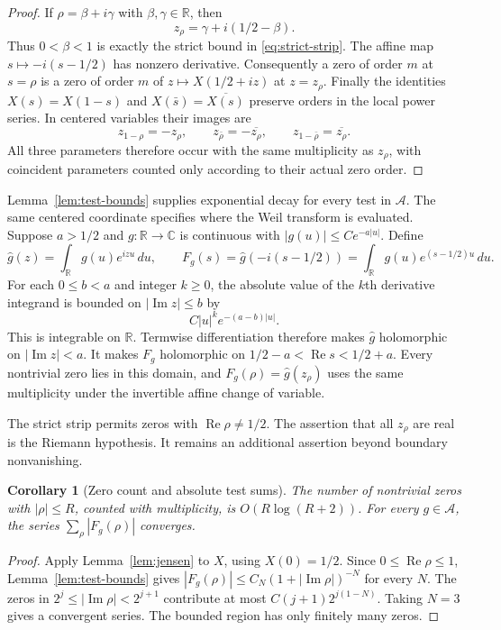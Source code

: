 \documentclass[11pt]{article}
\newtheorem{corollary}[theorem]{Corollary}
\theoremstyle{definition}
\theoremstyle{remark}
\numberwithin{equation}{section}
\newcommand{\R}{\mathbb R}
\newcommand{\C}{\mathbb C}
\newcommand{\A}{\mathcal A}
\begin{document}
\begin{proof}
If $\rho=\beta+i\gamma$ with $\beta,\gamma\in\R$, then
\[
 z_\rho=\gamma+i(1/2-\beta).
\]
Thus $0<\beta<1$ is exactly the strict bound in
\eqref{eq:strict-strip}.
The affine map $s\mapsto-i(s-1/2)$ has nonzero derivative.
Consequently a zero of order $m$ at $s=\rho$ is a zero of order $m$
of $z\mapsto X(1/2+iz)$ at $z=z_\rho$.
Finally the identities $X(s)=X(1-s)$ and
$X(\bar s)=\overline{X(s)}$ preserve orders in the local power series.
In centered variables their images are
\[
 z_{1-\rho}=-z_\rho,\qquad
 z_{\bar\rho}=-\overline{z_\rho},\qquad
 z_{1-\bar\rho}=\overline{z_\rho}.
\]
All three parameters therefore occur with the same multiplicity as
$z_\rho$, with coincident parameters counted only according to their
actual zero order.
\end{proof}

Lemma~\ref{lem:test-bounds} supplies exponential decay for every test in $\A$.
The same centered coordinate specifies where the Weil transform is
evaluated.  Suppose $a>1/2$ and $g:\R\to\C$ is continuous with
$|g(u)|\leq C e^{-a|u|}$.
Define
\[
 \widehat g(z)=\int_{\R}g(u)e^{izu}\,du,
 \qquad
 F_g(s)=\widehat g(-i(s-1/2))
       =\int_{\R}g(u)e^{(s-1/2)u}\,du.
\]
For each $0\leq b<a$ and integer $k\geq0$, the absolute value of the
$k$th derivative integrand is bounded on $|\operatorname{Im}z|\leq b$ by
\[
 C|u|^k e^{-(a-b)|u|}.
\]
This is integrable on $\R$.
Termwise differentiation therefore makes $\widehat g$ holomorphic on
$|\operatorname{Im}z|<a$.
It makes $F_g$ holomorphic on
$1/2-a<\operatorname{Re}s<1/2+a$.
Every nontrivial zero lies in this domain, and
$F_g(\rho)=\widehat g(z_\rho)$ uses the same multiplicity under the
invertible affine change of variable.

The strict strip permits zeros with $\operatorname{Re}\rho\ne1/2$.
The assertion that all $z_\rho$ are real is the Riemann hypothesis.
It remains an additional assertion beyond boundary nonvanishing.

\begin{corollary}[Zero count and absolute test sums]
\label{cor:zero-count}
The number of nontrivial zeros with $|\rho|\leq R$, counted with multiplicity,
is $O(R\log(R+2))$.
For every $g\in\A$, the series $\sum_\rho|F_g(\rho)|$ converges.
\end{corollary}

\begin{proof}
Apply Lemma~\ref{lem:jensen} to $X$, using $X(0)=1/2$.
Since $0\leq\operatorname{Re}\rho\leq1$, Lemma~\ref{lem:test-bounds}
gives $|F_g(\rho)|\leq C_N(1+|\operatorname{Im}\rho|)^{-N}$ for every $N$.
The zeros in $2^j\leq|\operatorname{Im}\rho|<2^{j+1}$ contribute at most
$C(j+1)2^{j(1-N)}$.  Taking $N=3$ gives a convergent series.
The bounded region has only finitely many zeros.
\end{proof}
\end{document}
